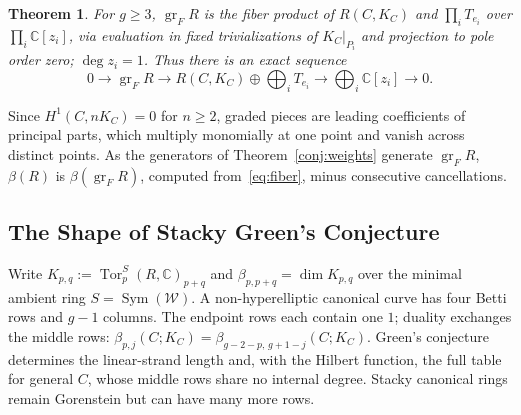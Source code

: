 \documentclass[11pt,reqno]{amsart}
\newtheorem{theorem}[lemma]{Theorem}
\theoremstyle{remark}
\newcommand{\Tor}{\operatorname{Tor}}
\newcommand{\Sym}{\operatorname{Sym}} %
\newcommand{\CC}{\mathbb{C}}
\newcommand{\cW}{\mathcal{W}}
\begin{document}
\begin{theorem}\label{conj:degeneration}
For $g\ge3$, $\operatorname{gr}_F R$ is the fiber product of $R(C,K_C)$ and $\prod_iT_{e_i}$ over $\prod_i\CC[z_i]$, via evaluation in fixed trivializations of $K_C|_{P_i}$ and projection to pole order zero; $\deg z_i=1$. Thus there is an exact sequence\begin{equation}\label{eq:fiber}
0\longrightarrow\operatorname{gr}_F R
\longrightarrow R(C,K_C)\oplus\bigoplus_iT_{e_i}
\longrightarrow\bigoplus_i\CC[z_i]
\longrightarrow0.
\end{equation}
\end{theorem}

Since $H^1(C,nK_C)=0$ for $n\ge2$, graded pieces are leading coefficients of principal parts, which multiply monomially at one point and vanish across distinct points. As the generators of Theorem~\ref{conj:weights} generate $\operatorname{gr}_FR$, $\beta(R)$ is $\beta(\operatorname{gr}_FR)$, computed from~\eqref{eq:fiber}, minus consecutive cancellations.
 
\subsection{The Shape of Stacky Green's Conjecture}\label{subsec:shape-stacky-green}

Write $K_{p,q}:=\Tor_p^S(R,\CC)_{p+q}$ and $\beta_{p,p+q}=\dim K_{p,q}$ over the minimal ambient ring $S=\Sym(\cW)$. A non-hyperelliptic canonical curve has four Betti rows and $g-1$ columns. The endpoint rows each contain one $1$; duality exchanges the middle rows: $\beta_{p,j}(C;K_C)=\beta_{g-2-p,\,g+1-j}(C;K_C)$. Green's conjecture determines the linear-strand length and, with the Hilbert function, the full table for general $C$, whose middle rows share no internal degree. Stacky canonical rings remain Gorenstein but can have many more rows.
\end{document}
